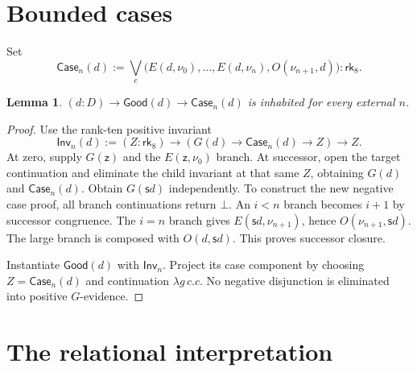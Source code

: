 \documentclass[11pt,a4paper]{article}
\newcommand{\rk}[1]{\mathsf{rk}_{#1}}
\newcommand{\Good}{\mathsf{Good}}
\newcommand{\Case}{\mathsf{Case}}
\newcommand{\Inv}{\mathsf{Inv}}
\newcommand{\z}{\mathsf z}
\newcommand{\suc}{\mathsf s}
\newtheorem{lemma}{Lemma}
\theoremstyle{remark}\newtheorem*{remark}{Remark}
\begin{document}
\section{Bounded cases}\label{sec:cases}
Set
\[
 \Case_n(d):=\bigvee_c\bigl(E(d,\nu_0),\ldots,E(d,\nu_n),O(\nu_{n+1},d)\bigr)
       :\rk8.
\]
\begin{lemma}\label{case}
$(d:D)\to\Good(d)\to\Case_n(d)$ is inhabited for every external $n$.
\end{lemma}
\begin{proof}
Use the rank-ten positive invariant
\[
 \Inv_n(d):=(Z:\rk8)\to(G(d)\to\Case_n(d)\to Z)\to Z.
\]
At zero, supply $G(\z)$ and the $E(\z,\nu_0)$ branch. At successor, open
the target continuation and eliminate the child invariant at that same
$Z$, obtaining $G(d)$ and $\Case_n(d)$. Obtain $G(\suc d)$ independently.
To construct the new negative case proof, all branch continuations return
$\bot$. An $i<n$ branch becomes $i+1$ by successor congruence.
The $i=n$ branch gives $E(\suc d,\nu_{n+1})$, hence
$O(\nu_{n+1},\suc d)$. The large branch is composed with
$O(d,\suc d)$. This proves successor closure.

Instantiate $\Good(d)$ with $\Inv_n$. Project its case component by
choosing $Z=\Case_n(d)$ and continuation $\lambda g\,c.c$.
No negative disjunction is eliminated into positive $G$-evidence.
\end{proof}

\section{The relational interpretation}\label{sec:relational}
\end{document}
